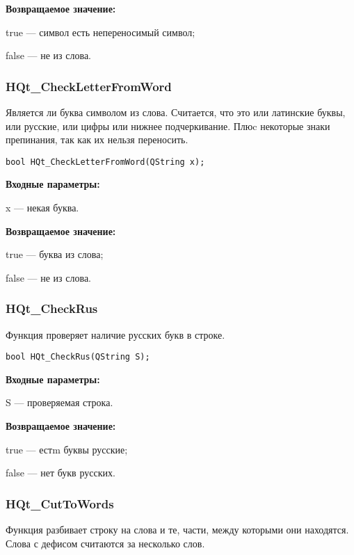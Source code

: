 \documentclass[a4paper,12pt]{article}
\begin{document}
\textbf{Возвращаемое значение:}
 
true --- символ есть непереносимый символ;

false --- не из слова.


\subsubsection{HQt\_CheckLetterFromWord}\label{HQt_CheckLetterFromWord}

Является ли буква символом из слова. Считается, что это или латинские буквы, или русские, или цифры или нижнее подчеркивание. Плюc некоторые знаки препинания, так как их нельзя переносить.


\begin{lstlisting}[label=code_syntax_HQt_CheckLetterFromWord,caption=Синтаксис]
bool HQt_CheckLetterFromWord(QString x);
\end{lstlisting}

\textbf{Входные параметры:}

x --- некая буква.

\textbf{Возвращаемое значение:}
 
true --- буква из слова;

false --- не из слова.


\subsubsection{HQt\_CheckRus}\label{HQt_CheckRus}

Функция проверяет наличие русских букв в строке.


\begin{lstlisting}[label=code_syntax_HQt_CheckRus,caption=Синтаксис]
bool HQt_CheckRus(QString S);
\end{lstlisting}

\textbf{Входные параметры:}

S --- проверяемая строка.

\textbf{Возвращаемое значение:}
 
true --- естm буквы русские;
 
    false --- нет букв русских.


\subsubsection{HQt\_CutToWords}\label{HQt_CutToWords}

Функция разбивает строку на слова и те, части, между которыми они находятся. Слова с дефисом считаются за несколько слов.
\end{document}
